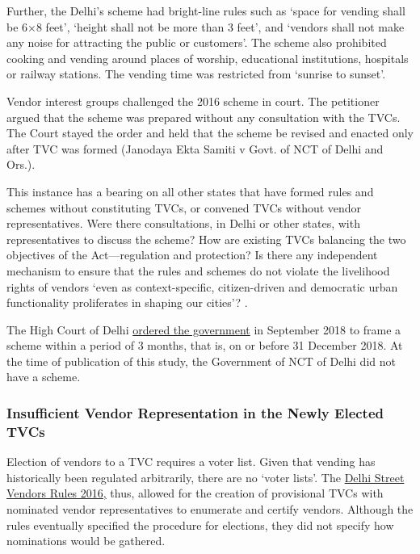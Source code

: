 \documentclass[a4paper, 12pt, twoside, table]{article}
\begin{document}
{{Further, the Delhi’s scheme had bright-line rules such as `space for vending shall be 6×8 feet', `height shall not be more than 3 feet', and `vendors shall not make any noise for attracting the public or customers'. The scheme also prohibited cooking and vending around places of worship, educational institutions, hospitals or railway stations. The vending time was restricted from `sunrise to sunset'. 

Vendor interest groups challenged the 2016 scheme in court. The petitioner argued that the scheme was prepared without any consultation with the TVCs. The Court stayed the order and held that the scheme be revised and enacted only after TVC was formed (Janodaya Ekta Samiti v Govt. of NCT of Delhi and Ors.). 

This instance has a bearing on all other states that have formed rules and schemes without constituting TVCs, or convened TVCs without vendor representatives. Were there consultations, in Delhi or other states, with representatives to discuss the scheme? How are existing TVCs balancing the two objectives of the Act—regulation and protection? Is there any independent mechanism to ensure that the rules and schemes do not violate the livelihood rights of vendors `even as context-specific, citizen-driven and democratic urban functionality proliferates in shaping our cities'? \parencite{naikpaper}. 

The High Court of Delhi \href{https://indiankanoon.org/doc/107567214/}{ordered the government} in September 2018 to frame a scheme within a period of 3 months, that is, on or before 31 December 2018. At the time of publication of this study, the Government of NCT of Delhi did not have a scheme. 


\subsubsection*{Insufficient Vendor Representation in the Newly Elected TVCs}

Election of vendors to a TVC requires a voter list. Given that vending has historically been regulated arbitrarily, there are no `voter lists'. The \href{http://www.delhi.gov.in/wps/wcm/connect/c18e8c804b4db8f4bf5bff2b25f02d05/rules+and+schemes+for+street+612016.pdf?MOD=AJPERES\&lmod=1038658906\&CACHEID=c18e8c804b4db8f4bf5bff2b25f02d05}{Delhi Street Vendors Rules 2016,} thus, allowed for the creation of provisional TVCs with nominated vendor representatives to enumerate and certify vendors. Although the rules eventually specified the procedure for elections, they did not specify how nominations would be gathered.

}}
\end{document}
